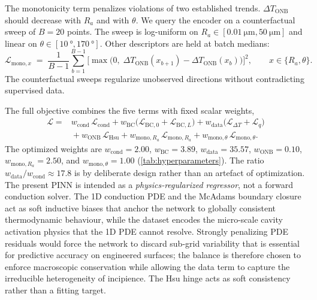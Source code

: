 The monotonicity term penalizes violations of two established trends.
$\Delta T_{\mathrm{ONB}}$ should decrease with $R_a$ and with $\theta$.
We query the encoder on a counterfactual sweep of $B=\num{20}$ points.
The sweep is log-uniform on
$R_a \in [\SI{0.01}{\micro\meter},\SI{50}{\micro\meter}]$ and linear on
$\theta \in [\SI{10}{\degree},\SI{170}{\degree}]$. Other descriptors
are held at batch medians:
%
\begin{equation}\label{eq:L_mono}
\mathcal{L}_{\mathrm{mono},x}
\;=\;
\frac{1}{B-1}
\sum_{b=1}^{B-1}
\bigl[
\max\bigl(0,\;
\Delta T_{\mathrm{ONB}}(x_{b+1}) - \Delta T_{\mathrm{ONB}}(x_{b})
\bigr)
\bigr]^{2},
\qquad x \in \{R_a, \theta\}.
\end{equation}
%
The counterfactual sweeps regularize unobserved directions without
contradicting supervised data.

The full objective combines the five terms with fixed scalar weights,
%
\begin{equation}\label{eq:L_total}
\begin{aligned}
\mathcal{L} = {}
& w_{\mathrm{cond}}\,\mathcal{L}_{\mathrm{cond}}
+ w_{\mathrm{BC}}\bigl(\mathcal{L}_{\mathrm{BC},0} + \mathcal{L}_{\mathrm{BC},L}\bigr)
+ w_{\mathrm{data}}\bigl(\mathcal{L}_{\Delta T} + \mathcal{L}_{q}\bigr) \\
& {} + w_{\mathrm{ONB}}\,\mathcal{L}_{\mathrm{Hsu}}
+ w_{\mathrm{mono},R_a}\,\mathcal{L}_{\mathrm{mono},R_a}
+ w_{\mathrm{mono},\theta}\,\mathcal{L}_{\mathrm{mono},\theta}.
\end{aligned}
\end{equation}
%
The optimized weights are $w_{\mathrm{cond}}=\num{2.00}$,
$w_{\mathrm{BC}}=\num{3.89}$, $w_{\mathrm{data}}=\num{35.57}$,
$w_{\mathrm{ONB}}=\num{0.10}$, $w_{\mathrm{mono},R_a}=\num{2.50}$, and
$w_{\mathrm{mono},\theta}=\num{1.00}$ (\cref{tab:hyperparameters}). The
ratio $w_{\mathrm{data}}/w_{\mathrm{cond}} \approx 17.8$ is by
deliberate design rather than an artefact of optimization. The
present PINN is intended as a \emph{physics-regularized regressor}, not
a forward conduction solver. The 1D conduction PDE and the McAdams
boundary closure act as soft inductive biases that anchor the network
to globally consistent thermodynamic behaviour, while the dataset
encodes the micro-scale cavity activation physics that the 1D PDE
cannot resolve. Strongly penalizing PDE residuals would force the
network to discard sub-grid variability that is essential for
predictive accuracy on engineered surfaces; the balance is therefore
chosen to enforce macroscopic conservation while allowing the data
term to capture the irreducible heterogeneity of incipience. The Hsu
hinge acts as soft consistency rather than a fitting target.

